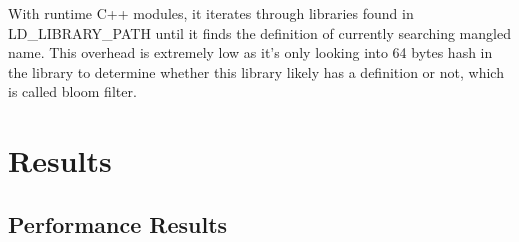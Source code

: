\documentclass{webofc}
\begin{document}
With runtime C++ modules, it iterates through libraries found in LD\_LIBRARY\_PATH until it finds the definition of currently searching mangled name. This overhead is extremely low as it's only looking into 64 bytes hash in the library to determine whether this library likely has a definition or not, which is called bloom filter.

\section{Results}
\label{results}

\subsection{Performance Results}
\label{performance}

\begin{figure}
\centering
    \begin{minipage}{.48\textwidth}
 　 \end{minipage}\hfill
    \begin{minipage}{.48\textwidth}

\end{minipage}
\end{figure}
\end{document}
